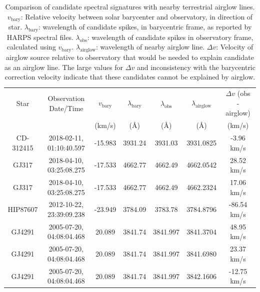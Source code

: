 \documentclass[linenumbers]{aastex631}
\begin{document}
\begin{table}
\begin{center}
    \begin{tabular}{|c|c|c|c|c|c|c|}
    \hline 
    Star & Observation Date/Time  & $v_{\mbox{bary}}$ & $\lambda_{\mbox{bary}}$ & $\lambda_{\mbox{obs}}$ & $\lambda_{\mbox{airglow}}$ & $\Delta v$ (obs - airglow) \\
    & & (km/s) & (\AA) & (\AA) & (\AA) & (km/s) \\
    \hline
    CD-312415 & 2018-02-11, 01:10:40.597 & -15.983 & 3931.24 & 3931.03 & 
    3931.0825 & -3.96 km/s \\
    GJ317 &  2018-04-10, 03:25:08.275 &  -17.533 & 4662.77 & 4662.49 & 
    4662.0542 & 28.52 km/s \\
    GJ317 &  2018-04-10, 03:25:08.275 &  -17.533 & 4662.77 & 4662.49 & 
    4662.2324 & 17.06 km/s \\
    HIP87607 & 2012-10-22, 23:39:09.238 & -23.949 & 3784.09 & 3783.78 &
    3784.8796 & -86.54 km/s \\
    GJ4291 & 2005-07-20, 04:08:04.468 & 20.089 &  3841.74 & 3841.997 &
    3841.3704 & 48.95 km/s \\
    GJ4291 & 2005-07-20, 04:08:04.468 &  20.089 &  3841.74 & 3841.997 &
    3841.6980  & 23.37 km/s \\
    GJ4291 & 2005-07-20, 04:08:04.468 &  20.089 &  3841.74 & 3841.997 &
    3842.1606  & -12.75 km/s \\
    \hline
    \end{tabular}
\end{center}    

\caption{Comparison of candidate spectral signatures with nearby terrestrial airglow lines.  $v_{\mbox{bary}}$:  Relative velocity between solar barycenter and observatory, in direction of star.  $\lambda_{\mbox{bary}}$: wavelength of candidate spikes, in barycentric frame, as reported by HARPS spectral files.  $\lambda_{\mbox{obs}}$: wavelength of candidate spikes in observatory frame, calculated using  $v_{\mbox{bary}}$. 
 $\lambda_{\mbox{airglow}}$: wavelength of nearby airglow line. $\Delta v$: Velocity of airglow source relative to observatory that would be needed to explain candidate as an airglow line.  The large values for $\Delta v$ and inconsistency with the barycentric correction velocity indicate that these candidates cannot be explained by airglow.}
\label{table:airglow_difference}
\end{table}

\end{document}
